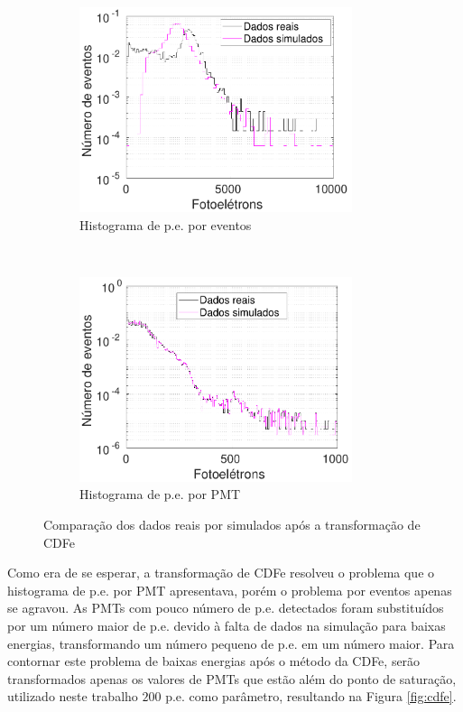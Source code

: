 \begin{figure}[ht]
	\centering
	\begin{subfigure}{0.5\textwidth}
		\centering
		\includegraphics[width=8cm]{textuais/simulacao/figuras/hist_pmt2.pdf}
		\caption{Histograma de p.e. por eventos}
		\label{fig:a2}
	\end{subfigure}%
	~ 
	\begin{subfigure}{0.5\textwidth}
		\centering
		\includegraphics[width=8cm]{textuais/simulacao/figuras/hist_evt2.pdf}
		\caption{Histograma de p.e. por PMT}
		\label{fig:b2}
	\end{subfigure}
	\caption{Comparação dos dados reais por simulados após a transformação de CDFe}
\end{figure}

Como era de se esperar, a transformação de CDFe resolveu o problema que o histograma de p.e. por PMT apresentava, porém o problema por eventos apenas se agravou. As PMTs com pouco número de p.e. detectados foram substituídos por um número maior de p.e. devido à falta de dados na simulação para baixas energias, transformando um número pequeno de p.e. em um número maior. Para contornar este problema de baixas energias após o método da CDFe, serão transformados apenas os valores de PMTs que estão além do ponto de saturação, utilizado neste trabalho $200$ p.e. como parâmetro, resultando na Figura \ref{fig:cdfe}.

